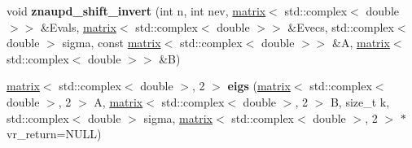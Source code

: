 \begin{DoxyCompactItemize}
\item 
\hypertarget{namespacekeycpp_a76e9f0c111ebd439a8457c6d11a5c97f}{void {\bfseries znaupd\-\_\-shift\-\_\-invert} (int n, int nev, \hyperlink{classkeycpp_1_1matrix}{matrix}$<$ std\-::complex$<$ double $>$$>$ \&Evals, \hyperlink{classkeycpp_1_1matrix}{matrix}$<$ std\-::complex$<$ double $>$$>$ \&Evecs, std\-::complex$<$ double $>$ sigma, const \hyperlink{classkeycpp_1_1matrix}{matrix}$<$ std\-::complex$<$ double $>$$>$ \&A, \hyperlink{classkeycpp_1_1matrix}{matrix}$<$ std\-::complex$<$ double $>$$>$ \&B)}\label{namespacekeycpp_a76e9f0c111ebd439a8457c6d11a5c97f}

\item 
\hypertarget{namespacekeycpp_a495cd6f90a746c4a2f39736e865b3096}{\hyperlink{classkeycpp_1_1matrix}{matrix}$<$ std\-::complex$<$ double $>$, 2 $>$ {\bfseries eigs} (\hyperlink{classkeycpp_1_1matrix}{matrix}$<$ std\-::complex$<$ double $>$, 2 $>$ A, \hyperlink{classkeycpp_1_1matrix}{matrix}$<$ std\-::complex$<$ double $>$, 2 $>$ B, size\-\_\-t k, std\-::complex$<$ double $>$ sigma, \hyperlink{classkeycpp_1_1matrix}{matrix}$<$ std\-::complex$<$ double $>$, 2 $>$ $\ast$vr\-\_\-return=N\-U\-L\-L)}\label{namespacekeycpp_a495cd6f90a746c4a2f39736e865b3096}

\end{DoxyCompactItemize}


